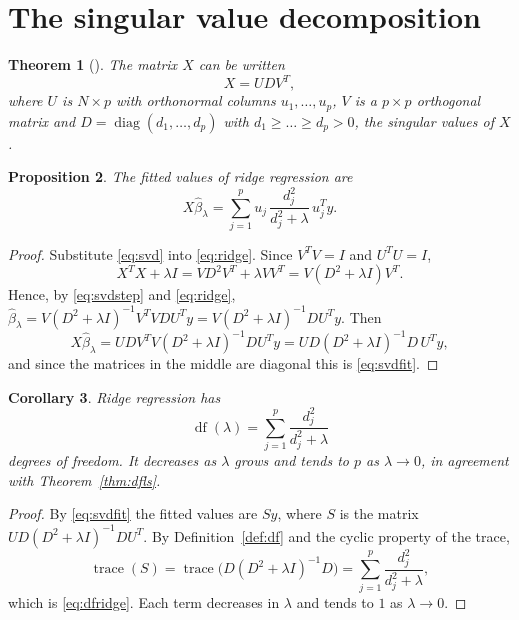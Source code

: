 \documentclass[11pt,oneside,openany]{book}
\newtheorem{theorem}{Theorem}[chapter]
\newtheorem{proposition}[theorem]{Proposition}
\newtheorem{corollary}[theorem]{Corollary}
\theoremstyle{definition}
\numberwithin{equation}{chapter}
\DeclareMathOperator{\trace}{trace}
\DeclareMathOperator{\df}{df}
\begin{document}
\section{The singular value decomposition}
\begin{theorem}[\citealp{eckart1936}]\label{thm:svd}
The matrix $X$ can be written
\begin{equation}\label{eq:svd}
X = U D V^T ,
\end{equation}
where $U$ is $N \times p$ with orthonormal columns $u_1, \dots, u_p$, $V$ is a $p \times p$ orthogonal matrix and
$D = \operatorname{diag}(d_1, \dots, d_p)$ with $d_1 \ge \dots \ge d_p > 0$, the \emph{singular values} of $X$.
\end{theorem}
\begin{proposition}\label{prop:svdfit}
The fitted values of ridge regression are
\begin{equation}\label{eq:svdfit}
X \hat\beta_\lambda = \sum_{j=1}^{p} u_j \, \frac{d_j^2}{d_j^2 + \lambda} \, u_j^T y .
\end{equation}
\end{proposition}
\begin{proof}
Substitute \eqref{eq:svd} into \eqref{eq:ridge}. Since $V^TV = I$ and $U^T U = I$,
\begin{equation}\label{eq:svdstep}
X^T X + \lambda I = V D^2 V^T + \lambda V V^T = V (D^2 + \lambda I) V^T .
\end{equation}
Hence, by \eqref{eq:svdstep} and \eqref{eq:ridge}, $\hat\beta_\lambda = V (D^2 + \lambda I)^{-1} V^T V D U^T y = V (D^2 + \lambda I)^{-1} D U^T y$.
Then
\[
X \hat\beta_\lambda = U D V^T V (D^2 + \lambda I)^{-1} D U^T y = U D (D^2 + \lambda I)^{-1} D \, U^T y ,
\]
and since the matrices in the middle are diagonal this is \eqref{eq:svdfit}.
\end{proof}
\begin{corollary}\label{cor:dfridge}
Ridge regression has
\begin{equation}\label{eq:dfridge}
\df(\lambda) = \sum_{j=1}^{p} \frac{d_j^2}{d_j^2 + \lambda}
\end{equation}
degrees of freedom. It decreases as $\lambda$ grows and tends to $p$ as $\lambda \to 0$, in agreement with Theorem~\ref{thm:dfls}.
\end{corollary}
\begin{proof}
By \eqref{eq:svdfit} the fitted values are $Sy$, where $S$ is the matrix $U D (D^2 + \lambda I)^{-1} D U^T$. By
Definition~\ref{def:df} and the cyclic property of the trace,
\[
\trace(S) = \trace\big(D (D^2+\lambda I)^{-1} D\big) = \sum_{j=1}^{p} \frac{d_j^2}{d_j^2 + \lambda},
\]
which is \eqref{eq:dfridge}. Each term decreases in $\lambda$ and tends to $1$ as $\lambda \to 0$.
\end{proof}
\end{document}

